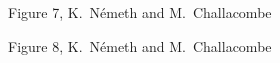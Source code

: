 \twolinestyle{\documentclass[prb,preprint]{revtex4}}
\begin{document}
{\clearpage

\begin{center}
Figure 7, K.~N\'emeth and M.~Challacombe \\[1.cm]
\end{center}

\clearpage

\begin{center}
Figure 8, K.~N\'emeth and M.~Challacombe \\[1.cm]
\end{center}

}
\end{document}
